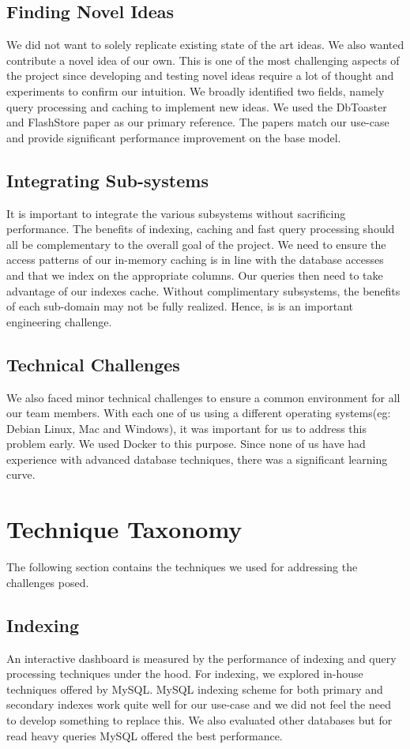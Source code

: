 \subsection{Finding Novel Ideas}
We did not want to solely replicate  existing state of the art ideas. We also wanted contribute a novel idea of our own. This is one of the most challenging aspects of the project since developing and testing novel ideas require a lot of thought and experiments to confirm our intuition. We broadly identified two fields, namely query processing and caching to implement new ideas. We used the DbToaster\cite{DbToaster} and FlashStore\cite{FlashStore} paper as our primary reference. The papers match our use-case and provide significant performance improvement on the base model.

\subsection{Integrating Sub-systems}
It is important to integrate the various subsystems without sacrificing performance. The benefits of indexing, caching and fast query processing should all be complementary to the overall goal of the project. We need to ensure the access patterns of our in-memory caching is in line with the database accesses and that we index on the appropriate columns. Our queries then need to take advantage of our indexes cache. Without complimentary subsystems, the benefits of each sub-domain may not be fully realized. Hence, is is an important engineering challenge.

\subsection{Technical Challenges}
We also faced minor technical challenges to ensure a common environment for all our team members. With each one of us using a different operating systems(eg: Debian Linux, Mac and Windows), it was important for us to address this problem early. We used Docker\cite{Docker} to this purpose. Since none of us have had experience with advanced database techniques, there was a significant learning curve.

\section{Technique Taxonomy}
The following section contains the techniques we used for addressing the challenges posed.

\subsection{Indexing}
An interactive dashboard is measured by the performance of indexing and query processing techniques under the hood. For indexing, we explored in-house techniques offered by MySQL\cite{MySQL}. MySQL indexing scheme for both primary and secondary indexes work quite well for our use-case and we did not feel the need to develop something to replace this. We also evaluated other databases but for read heavy queries MySQL offered the best performance. 

